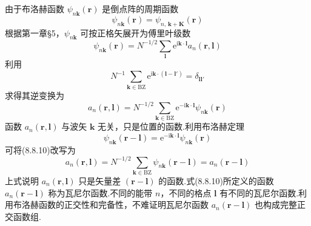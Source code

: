 由于布洛赫函数 $\psi_{n\boldsymbol{k}}(\boldsymbol{r})$ 是倒点阵的周期函数
\begin{equation}
  \psi_{n\boldsymbol{k}}(\boldsymbol{r})=\psi_{n,\,\boldsymbol{k}+\boldsymbol{K}}(\boldsymbol{r})
\end{equation}
根据第一章§5，$\psi_{n\boldsymbol{k}}$ 可按正格矢展开为傅里叶级数
\begin{equation}
  \psi_{n\boldsymbol{k}}(\boldsymbol{r})=N^{-1/2}\sum_{\boldsymbol{l}}\mathrm{e}^{\mathrm{i}\boldsymbol{k}\cdot\boldsymbol{l}}a_{n}(\boldsymbol{r},\boldsymbol{l})
\end{equation}
利用
\begin{equation*}
  N^{-1}\sum_{\boldsymbol{k}\in\mathrm{BZ}}\mathrm{e}^{\mathrm{i}\boldsymbol{k}\cdot(\boldsymbol{l}-\boldsymbol{l}')}=\delta_{\boldsymbol{l}\boldsymbol{l}'}
\end{equation*}
求得其逆变换为
\begin{equation}
  a_{n}(\boldsymbol{r},\boldsymbol{l})=N^{-1/2}\sum_{\boldsymbol{k}\in\mathrm{BZ}}\mathrm{e}^{-\mathrm{i}\boldsymbol{k}\cdot\boldsymbol{l}}\psi_{n\boldsymbol{k}}(\boldsymbol{r})
\end{equation}
函数 $a_{n}(\boldsymbol{r},\boldsymbol{l})$ 与波矢 $\boldsymbol{k}$ 无关，只是位置的函数.利用布洛赫定理
\begin{equation}
  \psi_{n\boldsymbol{k}}(\boldsymbol{r}-\boldsymbol{l})=\mathrm{e}^{-\mathrm{i}\boldsymbol{k}\cdot\boldsymbol{l}}\psi_{n\boldsymbol{k}}(\boldsymbol{r})
\end{equation}
可将(8.8.10)改写为
\begin{equation}
  a_{n}(\boldsymbol{r},\boldsymbol{l})=N^{-1/2}\sum_{\boldsymbol{k}\in\mathrm{BZ}}\psi_{n\boldsymbol{k}}(\boldsymbol{r}-\boldsymbol{l})
  =a_{n}(\boldsymbol{r}-\boldsymbol{l})
\end{equation}
上式说明 $a_{n}(\boldsymbol{r},\boldsymbol{l})$ 只是矢量差 $(\boldsymbol{r}-\boldsymbol{l})$ 的函数.式(8.8.10)所定义的函数 $a_{n}(\boldsymbol{r}-\boldsymbol{l})$ 称为瓦尼尔函数.不同的能带 $n$，不同的格点 $\boldsymbol{l}$ 有不同的瓦尼尔函数.利用布洛赫函数的正交性和完备性，不难证明瓦尼尔函数 $a_{n}(\boldsymbol{r}-\boldsymbol{l})$ 也构成完整正交函数组.

